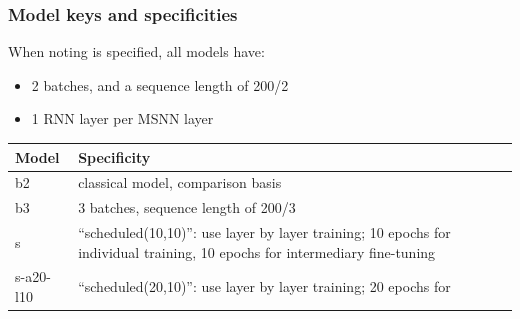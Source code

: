 \subsubsection{Model keys and
specificities}

When noting is specified, all models have:

\begin{itemize}
\item
  2 batches, and a sequence length of 200/2
\item
  1 RNN layer per MSNN layer
\end{itemize}

\begin{longtable}[]{@{}ll@{}}
\hline
\begin{minipage}[b]{0.08\columnwidth}\raggedright\strut
Model\strut
\end{minipage} & \begin{minipage}[b]{0.86\columnwidth}\raggedright\strut
Specificity\strut
\end{minipage}\tabularnewline
\hline
\endhead
\begin{minipage}[t]{0.08\columnwidth}\raggedright\strut
b2\strut
\end{minipage} & \begin{minipage}[t]{0.86\columnwidth}\raggedright\strut
classical model, comparison basis\strut
\end{minipage}\tabularnewline
\begin{minipage}[t]{0.08\columnwidth}\raggedright\strut
b3\strut
\end{minipage} & \begin{minipage}[t]{0.86\columnwidth}\raggedright\strut
3 batches, sequence length of 200/3\strut
\end{minipage}\tabularnewline
\begin{minipage}[t]{0.08\columnwidth}\raggedright\strut
s\strut
\end{minipage} & \begin{minipage}[t]{0.86\columnwidth}\raggedright\strut
``scheduled(10,10)'': use layer by layer training; 10 epochs for
individual training, 10 epochs for intermediary fine-tuning\strut
\end{minipage}\tabularnewline
\begin{minipage}[t]{0.08\columnwidth}\raggedright\strut
s-a20-l10\strut
\end{minipage} & \begin{minipage}[t]{0.86\columnwidth}\raggedright\strut
``scheduled(20,10)'': use layer by layer training; 20 epochs for

\end{minipage}
\end{longtable}
